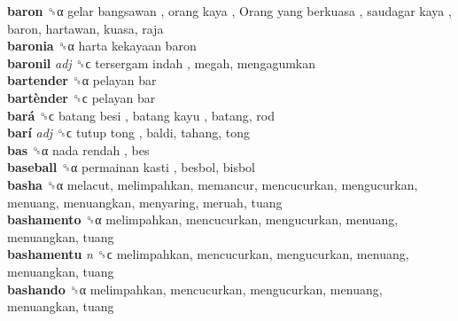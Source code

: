 \textbf{baron} ␝α   gelar bangsawan ,  orang kaya ,  Orang yang berkuasa ,  saudagar kaya , baron, hartawan, kuasa, raja  \\
\textbf{baronia} ␝α   harta kekayaan baron   \\
\textbf{baronil} \emph{adj}  ␝ϲ   tersergam indah , megah, mengagumkan  \\
\textbf{bartender} ␝α   pelayan bar   \\
\textbf{bartènder} ␝ϲ   pelayan bar   \\
\textbf{bará} ␝ϲ   batang besi ,  batang kayu , batang, rod  \\
\textbf{barí} \emph{adj}  ␝ϲ   tutup tong , baldi, tahang, tong  \\
\textbf{bas} ␝α   nada rendah , bes  \\
\textbf{baseball} ␝α   permainan kasti , besbol, bisbol  \\
\textbf{basha} ␝α  melacut, melimpahkan, memancur, mencucurkan, mengucurkan, menuang, menuangkan, menyaring, meruah, tuang  \\
\textbf{bashamento} ␝α  melimpahkan, mencucurkan, mengucurkan, menuang, menuangkan, tuang  \\
\textbf{bashamentu} \emph{n}  ␝ϲ  melimpahkan, mencucurkan, mengucurkan, menuang, menuangkan, tuang  \\
\textbf{bashando} ␝α  melimpahkan, mencucurkan, mengucurkan, menuang, menuangkan, tuang  \\
